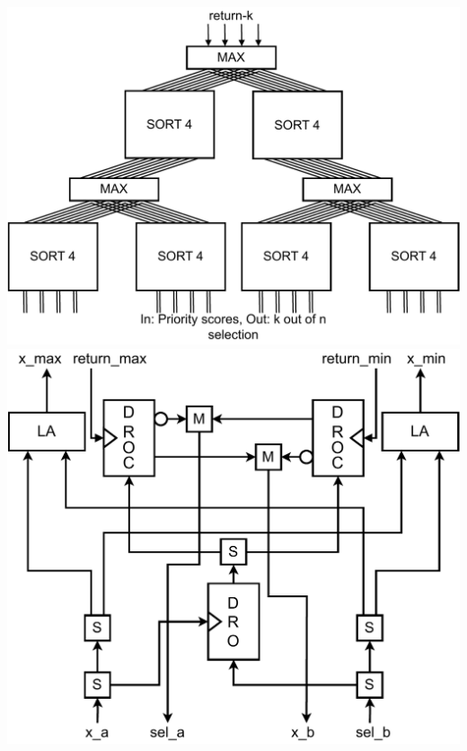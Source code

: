 \documentclass{article}
\begin{document}
\includegraphics*[width=0.25\paperwidth]{diagrams/arbiterk4n16.drawio.pdf}
\includegraphics*[width=0.25\paperwidth]{diagrams/circuit_comparator.drawio.pdf}
\end{document}
